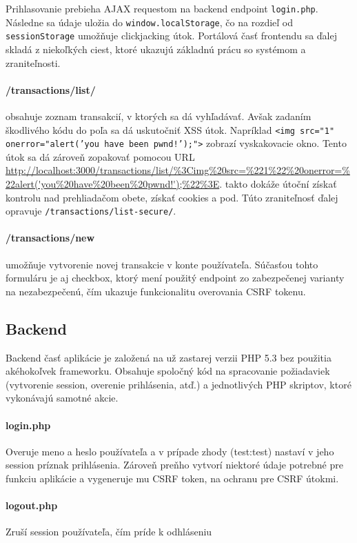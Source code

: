 \documentclass[12pt,a4paper]{article}
\begin{document}
		Prihlasovanie prebieha AJAX requestom na backend endpoint \texttt{login.php}. Následne sa údaje uložia do \texttt{window.localStorage}, čo na rozdieľ od \texttt{sessionStorage} umožňuje clickjacking útok.
		Portálová časť frontendu sa ďalej skladá z niekoľkých ciest, ktoré ukazujú základnú prácu so systémom a zraniteľnosti.
		\paragraph{/transactions/list/} obsahuje zoznam transakcií, v ktorých sa dá vyhľadávať. Avšak zadaním škodlivého kódu do poľa sa dá uskutočniť XSS útok. Napríklad \texttt{<img src="1" onerror="alert('you have been pwnd!');">} zobrazí vyskakovacie okno. Tento útok sa dá zároveň zopakovať pomocou URL \url{http://localhost:3000/transactions/list/\%3Cimg\%20src=\%221\%22\%20onerror=\%22alert('you\%20have\%20been\%20pwnd!');\%22\%3E}. takto dokáže útoční získať kontrolu nad prehliadačom obete, získať cookies a pod. Túto zraniteľnosť ďalej opravuje \texttt{/transactions/list-secure/}.
		\paragraph{/transactions/new} umožňuje vytvorenie novej transakcie v konte používateľa. Súčasťou tohto formuláru je aj checkbox, ktorý mení použitý endpoint zo zabezpečenej varianty na nezabezpečenú, čím ukazuje funkcionalitu overovania CSRF tokenu.
		
		
	\subsection{Backend}
		Backend časť aplikácie je založená na už zastarej verzii PHP 5.3 bez použitia akéhokoľvek frameworku. Obsahuje spoločný kód na spracovanie požiadaviek (vytvorenie session, overenie prihlásenia, atď.) a jednotlivých PHP skriptov, ktoré vykonávajú samotné akcie.
		
		\paragraph{login.php} Overuje meno a heslo používateľa a v prípade zhody (test:test) nastaví v jeho session príznak prihlásenia. Zároveň preňho vytvorí niektoré údaje potrebné pre funkciu aplikácie a vygeneruje mu CSRF token, na ochranu pre CSRF útokmi.
		\paragraph{logout.php} Zruší session používateľa, čím príde k odhláseniu
\end{document}
